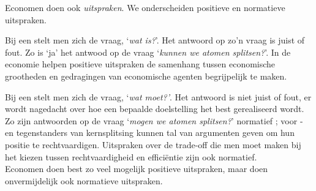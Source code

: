 \par\noindent Economen doen ook \textit{uitspraken}. We onderscheiden positieve en normatieve uitspraken.\par
Bij een  stelt men zich de vraag, `\textit{wat is?}'. Het antwoord op zo'n vraag is juist of fout. Zo is `ja' het antwood op de vraag `\textit{kunnen we atomen splitsen?}'. In de economie helpen positieve uitspraken de samenhang tussen economische grootheden en gedragingen van economische agenten begrijpelijk te maken.\par
Bij een  stelt men zich de vraag, `\textit{wat moet?'}. Het antwoord is niet juist of fout, er wordt nagedacht over hoe een bepaalde doelstelling het best gerealiseerd wordt. Zo zijn antwoorden op de vraag `\textit{mogen we atomen splitsen?}' normatief ; voor - en tegenstanders van kernsplitsing kunnen tal van argumenten geven om hun positie te rechtvaardigen. Uitspraken over de trade-off die men moet maken bij het kiezen tussen rechtvaardigheid en effici\"entie zijn ook normatief. \\
Economen doen best zo veel mogelijk positieve uitspraken, maar doen onvermijdelijk ook normatieve uitspraken.




